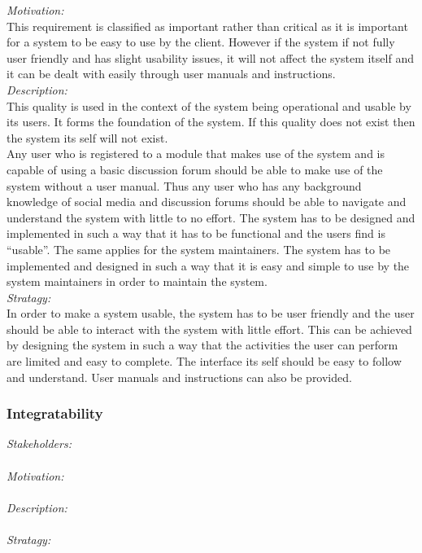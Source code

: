 \documentclass[a4paper,12pt]{report}
\begin{document}
		\emph{Motivation: }\\ This requirement is classified as important rather than critical as it is important for a system to be easy to use by the client. However if the system if not fully user friendly and has slight usability issues, it will not affect the system itself and it can be dealt with easily through user manuals and instructions. \\
		
		\emph{Description: }\\ This quality is used in the context of the system being operational and usable by its users. It forms the foundation of the system. If this quality does not exist then the system its self will not exist.\\
		Any user who is registered to a module that makes use of the system and is capable of using a basic discussion forum should be able to make use of the system without a user manual. Thus any user who has any background knowledge of social media and discussion forums should be able to navigate and understand the system with little to no effort. The system has to be designed and implemented in such a way that it has to be functional and the users find is “usable”. The same applies for the system maintainers. The system has to be implemented and designed in such a way that it is easy and simple to use by the system maintainers in order to maintain the system.\\
		
		\emph{Stratagy: }\\ In order to make a system usable, the system has to be user friendly and the user should be able to interact with the system with little effort. This can be achieved by designing the system in such a way that the activities the user can perform are limited and easy to complete. The interface its self should be easy to follow and understand. User manuals and instructions can also be provided.\\
			
		\subsubsection{Integratability}
		\emph{Stakeholders: }\\
		\\\emph{Motivation: }\\
		\\\emph{Description: }\\
		\\\emph{Stratagy: }\\
		
\end{document}
